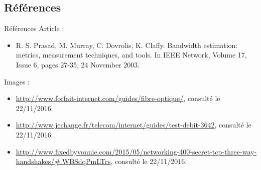 \documentclass[compress]{beamer}
\begin{document}
\subsection{Références}
\begin{frame}{Références}
Article :
\begin{itemize}
	\item R. S. Prasad, M. Murray, C. Dovrolis, K. Claffy. Bandwidth estimation: metrics, measurement techniques, and tools. In IEEE Network, Volume 17, Issue 6, pages 27-35, 24 November 2003. 
\end{itemize}
Images : 
\begin{itemize}
	\item \url{http://www.forfait-internet.com/guides/fibre-optique/}, consulté le 22/11/2016.
	\item \url{http://www.jechange.fr/telecom/internet/guides/test-debit-3642}, consulté le 22/11/2016.
	\item \url{http://www.fixedbyvonnie.com/2015/05/networking-400-secret-tcp-three-way-handshakes/\#.WBSdqPmLTcs}, consulté le 22/11/2016.
\end{itemize}
\end{frame}
\end{document}
